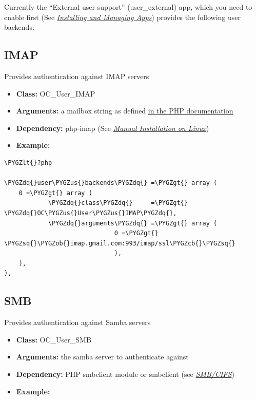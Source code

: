 \documentclass[letterpaper,10pt,english]{sphinxmanual}
\def\PYGZus{\char`\_}
\def\PYGZob{\char`\{}
\def\PYGZcb{\char`\}}
\def\PYGZlt{\char`\<}
\def\PYGZgt{\char`\>}
\def\PYGZsq{\char`\'}
\def\PYGZdq{\char`\"}
\begin{document}
Currently the “External user support” (user\_external) app, which you need to
enable first (See {\hyperref[installation/apps_management_installation::doc]{\emph{Installing and Managing Apps}}})
provides the following user backends:


\subsection{IMAP}
\label{configuration_user/user_auth_ftp_smb_imap:imap}
Provides authentication against IMAP servers
\begin{itemize}
\item {} 
\textbf{Class:} OC\_User\_IMAP

\item {} 
\textbf{Arguments:}  a mailbox string as defined \href{http://www.php.net/manual/en/function.imap-open.php}{in the PHP documentation}

\item {} 
\textbf{Dependency:} php-imap (See {\hyperref[installation/source_installation::doc]{\emph{Manual Installation on Linux}}})

\item {} 
\textbf{Example:}

\end{itemize}

\begin{Verbatim}[commandchars=\\\{\}]
\PYGZlt{}?php

\PYGZdq{}user\PYGZus{}backends\PYGZdq{} =\PYGZgt{} array (
    0 =\PYGZgt{} array (
            \PYGZdq{}class\PYGZdq{}     =\PYGZgt{} \PYGZdq{}OC\PYGZus{}User\PYGZus{}IMAP\PYGZdq{},
            \PYGZdq{}arguments\PYGZdq{} =\PYGZgt{} array (
                              0 =\PYGZgt{} \PYGZsq{}\PYGZob{}imap.gmail.com:993/imap/ssl\PYGZcb{}\PYGZsq{}
                              ),
    ),
),
\end{Verbatim}


\subsection{SMB}
\label{configuration_user/user_auth_ftp_smb_imap:smb}
Provides authentication against Samba servers
\begin{itemize}
\item {} 
\textbf{Class:} OC\_User\_SMB

\item {} 
\textbf{Arguments:} the samba server to authenticate against

\item {} 
\textbf{Dependency:} PHP smbclient module or smbclient (see
{\hyperref[configuration_files/external_storage/smb::doc]{\emph{SMB/CIFS}}})

\item {} 
\textbf{Example:}

\end{itemize}
\end{document}
